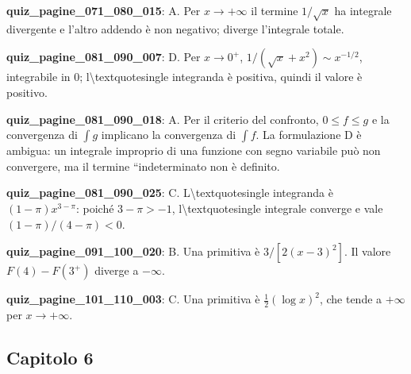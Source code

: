 \documentclass[11pt,a4paper]{article}
\newcounter{quiz}
\begin{document}
\noindent\textbf{quiz\_pagine\_071\_080\_015}: A. Per $x\to+\infty$ il termine $1/\sqrt{x}$ ha integrale divergente e l'altro addendo è non negativo; diverge l'integrale totale.\par\medskip
\noindent\textbf{quiz\_pagine\_081\_090\_007}: D. Per $x\to0^+$, $1/(\sqrt{x}+x^2)\sim x^{-1/2}$, integrabile in $0$; l\textbackslash{}textquotesingle integranda è positiva, quindi il valore è positivo.\par\medskip
\noindent\textbf{quiz\_pagine\_081\_090\_018}: A. Per il criterio del confronto, $0\leq f\leq g$ e la convergenza di $\int g$ implicano la convergenza di $\int f$. La formulazione D è ambigua: un integrale improprio di una funzione con segno variabile può non convergere, ma il termine ``indeterminato non è definito.\par\medskip
\noindent\textbf{quiz\_pagine\_081\_090\_025}: C. L\textbackslash{}textquotesingle integranda è $(1-\pi)x^{3-\pi}$: poiché $3-\pi>-1$, l\textbackslash{}textquotesingle integrale converge e vale $(1-\pi)/(4-\pi)<0$.\par\medskip
\noindent\textbf{quiz\_pagine\_091\_100\_020}: B. Una primitiva è $3/[2(x-3)^2]$. Il valore $F(4)-F(3^+)$ diverge a $-\infty$.\par\medskip
\noindent\textbf{quiz\_pagine\_101\_110\_003}: C. Una primitiva è $\frac12(\log x)^2$, che tende a $+\infty$ per $x\to+\infty$.\par\medskip
\subsection*{Capitolo 6}
\end{document}
